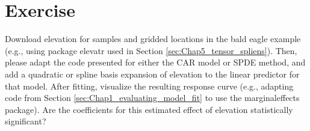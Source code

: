 \section{Exercise}

Download elevation for samples and gridded locations in the bald eagle example (e.g., using package \colorbox{backcolour}{elevatr} used in Section \ref{sec:Chap5_tensor_spliens}).  Then, please adapt the code presented for either the CAR model or SPDE method, and add a quadratic or spline basis expansion of elevation to the linear predictor for that model.  After fitting, visualize the resulting response curve (e.g., adapting code from Section \ref{sec:Chap1_evaluating_model_fit} to use the \colorbox{backcolour}{marginaleffects} package).  Are the coefficients for this estimated effect of elevation statistically significant?

